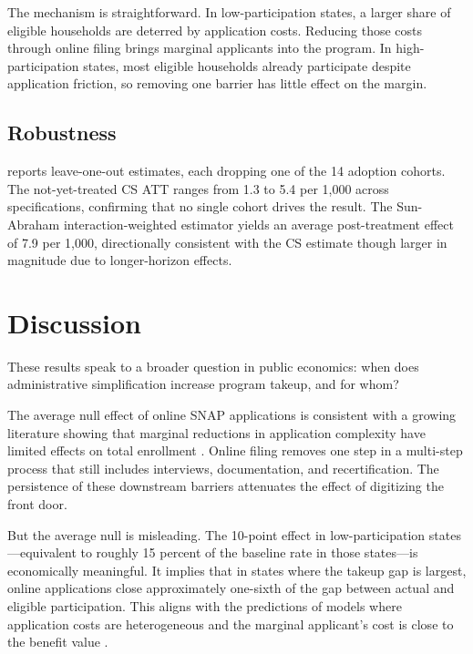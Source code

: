 \documentclass[12pt]{article}
\begin{document}
The mechanism is straightforward. In low-participation states, a larger share of eligible households are deterred by application costs. Reducing those costs through online filing brings marginal applicants into the program. In high-participation states, most eligible households already participate despite application friction, so removing one barrier has little effect on the margin.



\subsection{Robustness}

 reports leave-one-out estimates, each dropping one of the 14 adoption cohorts. The not-yet-treated CS ATT ranges from 1.3 to 5.4 per 1,000 across specifications, confirming that no single cohort drives the result. The Sun-Abraham interaction-weighted estimator yields an average post-treatment effect of 7.9 per 1,000, directionally consistent with the CS estimate though larger in magnitude due to longer-horizon effects.



\section{Discussion}

These results speak to a broader question in public economics: when does administrative simplification increase program takeup, and for whom?

The average null effect of online SNAP applications is consistent with a growing literature showing that marginal reductions in application complexity have limited effects on total enrollment \citep{bhargava2015, finkelstein2019}. Online filing removes one step in a multi-step process that still includes interviews, documentation, and recertification. The persistence of these downstream barriers attenuates the effect of digitizing the front door.

But the average null is misleading. The 10-point effect in low-participation states---equivalent to roughly 15 percent of the baseline rate in those states---is economically meaningful. It implies that in states where the takeup gap is largest, online applications close approximately one-sixth of the gap between actual and eligible participation. This aligns with the predictions of models where application costs are heterogeneous and the marginal applicant's cost is close to the benefit value \citep{moffitt1983}.
\end{document}
